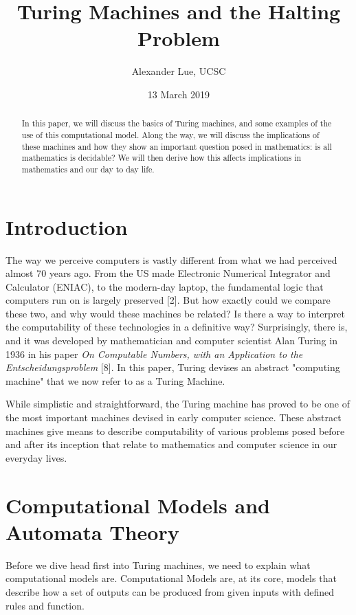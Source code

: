 \documentclass[12pt]{article}
\title{Turing Machines and the Halting Problem}
\author{Alexander Lue, UCSC}
\date{13 March 2019}
\begin{document}
\maketitle

\begin{abstract}
	In this paper, we will discuss the basics of Turing machines, and some examples of the use of this computational model. Along the way, we will discuss the implications of these machines and how they show an important question posed in mathematics: is all mathematics is decidable? We will then derive how this affects implications in mathematics and our day to day life.
\end{abstract}



\section{Introduction}

The way we perceive computers is vastly different from what we had perceived almost 70 years ago. From the US made Electronic Numerical Integrator and Calculator (ENIAC), to the modern-day laptop, the fundamental logic that computers run on is largely preserved [2]. But how exactly could we compare these two, and why would these machines be related? Is there a way to interpret the computability of these technologies in a definitive way? Surprisingly, there is, and it was developed by mathematician and computer scientist Alan Turing in 1936 in his paper \textit{On Computable Numbers, with an Application to the Entscheidungsproblem} [8]. In this paper, Turing devises an abstract "computing machine" that we now refer to as a Turing Machine.

While simplistic and straightforward, the Turing machine has proved to be one of the most important machines devised in early computer science. These abstract machines give means to describe computability of various problems posed before and after its inception that relate to mathematics and computer science in our everyday lives.



\section{Computational Models and Automata Theory}

Before we dive head first into Turing machines, we need to explain what computational models are. Computational Models are, at its core, models that describe how a set of outputs can be produced from given inputs with defined rules and function. 
\end{document}
